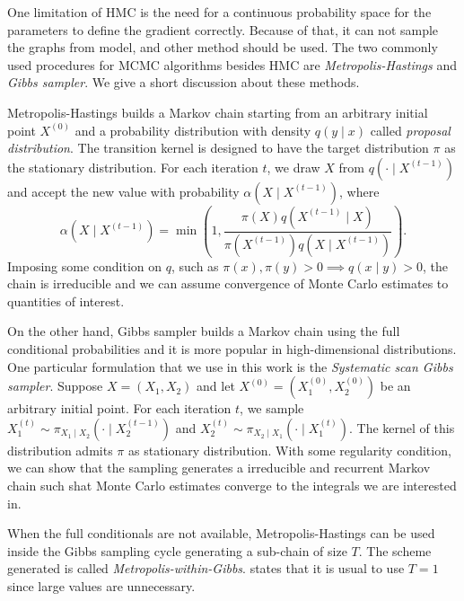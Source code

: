 One limitation of HMC is the need for a continuous probability space
for the parameters to define 
the gradient correctly. Because of that, it can not sample the graphs from 
\textcite{crawford2016} model, and other method should be used. The two commonly
used procedures for MCMC algorithms besides HMC are {\em Metropolis-Hastings} and
{\em Gibbs sampler}. We give a short discussion about these methods. 

Metropolis-Hastings builds a Markov chain starting from an arbitrary initial
point $X^{(0)}$ and a probability distribution with density $q(y \mid x)$ called {\em
proposal distribution}. The transition kernel is designed to have the target
distribution $\pi$ as the stationary distribution. For each iteration $t$, 
we draw $X$ from $q(\cdot \mid X^{(t-1)})$ and accept the new value with probability $\alpha(X \mid
X^{(t-1)})$, where 
\begin{equation}
  \label{eq:alpha-metropolis-hastings}
  \alpha(X \mid X^{(t-1)}) = \min\left(1, \frac{\pi(X)q(X^{(t-1)} \mid X)}{\pi(X^{(t-1)})q(X \mid X^{(t-1)})}\right).
\end{equation}
Imposing some condition on $q$, such as $\pi(x), \pi(y) > 0 \implies q(x \mid
y)>0$, the chain is irreducible \cite[p. 274]{robert2004monte} and we can assume
convergence of Monte Carlo estimates to quantities of interest. 

On the other hand, Gibbs sampler builds a Markov chain using the full
conditional probabilities and it is more popular in high-dimensional
distributions. One particular formulation that we use in this work is the {\em
Systematic scan Gibbs sampler}. Suppose $X = (X_1, X_2)$ and let $X^{(0)} =
(X_1^{(0)}, X_2^{(0)})$ be an arbitrary initial point. For each iteration $t$,
we sample $X_1^{(t)} \sim \pi_{X_1 \mid X_2}(\cdot \mid X_2^{(t-1)})$ and
$X_2^{(t)} \sim \pi_{X_2 \mid X_1}(\cdot \mid X_1^{(t)})$. The kernel of this
distribution admits $\pi$ as stationary distribution. With some regularity
condition, we can show that the sampling generates a irreducible and recurrent
Markov chain such shat Monte Carlo estimates converge to the integrals we are
interested in. 

When the full conditionals are not available, Metropolis-Hastings can be used
inside the Gibbs sampling cycle generating a sub-chain of size $T$. The scheme generated is called {\em
Metropolis-within-Gibbs}. \textcite[p. 213]{gamerman2006markov} states that it
is usual to use $T=1$ since large values are unnecessary. 